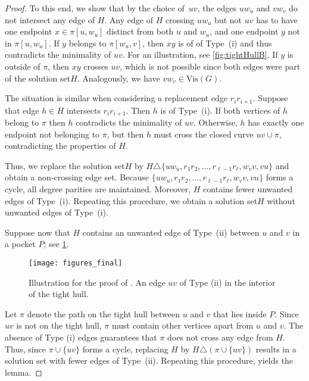 \documentclass[a4paper,runningheads,cleveref,thm-restate]{lipics-v2021}
\newcommand{\Vis}[1]{\ensuremath{\mathrm{Vis}(#1)}}
\newcommand{\hset}{solution set\xspace}
\begin{document}
\begin{proof}
	To this end, we show that by the choice of~$uv$, the edges $uw_u$ 
	 and $vw_v$ do not intersect any edge of $H$. 
	 Any edge of $H$ crossing $uw_u$ but not $uv$ has to have one endpoint $x \in \pi[u, w_u]$ distinct from both $u$ and $w_u$, and one endpoint $y$ not in 	$\pi[u,w_u]$. 
	 If $y$ belongs to $\pi[w_u, v]$, then $xy$ is of {of Type~(i)} and thus contradicts the minimality of $uv$. For an illustration, see  \cref{fig:tightHullB}.
	 If $y$ is outside of $\pi$, then $xy$ crosses $uv$, which is not possible since both edges were part of the \hset $H$. 
	 Analogously, we have $vw_v\in\Vis{G}$.

	The situation is similar when considering a replacement edge  $r_{i}r_{i+1}$.
	Suppose that edge $h \in H$ intersects $r_{i}r_{i+1}$.
	Then $h$ is of {Type~(i)}. If both vertices of $h$ belong to $\pi$ then $h$ contradicts the minimality of $uv$. Otherwise, $h$ has exactly one endpoint not belonging to $\pi$, but then $h$ 
	must cross the closed curve $uv \cup \pi$, contradicting the properties of $H$. 
	
	
	Thus, we replace the \hset $H$ by $H \triangle \{uw_u, r_{1}r_{2}, \dots, r_{\ell-1}r_\ell,w_vv,vu\}$ 
	and obtain a  non-crossing edge set.
	Because $\{uw_u, r_{1}r_{2}, \dots, r_{\ell-1}r_\ell,w_vv,vu\}$ forms a cycle, all degree parities are maintained. 
	Moreover, $H$ contains fewer unwanted edges of Type~(i). 
	Repeating this procedure, we obtain a \hset $H$ without unwanted edges of Type~(i). 

	
	Suppose now that $H$ contains an unwanted edge of Type~(ii) between $u$ and $v$ in a pocket $P$; see \cref{fig:tightHullC}. 
	\begin{figure}[htb]
		\centering
			\texttt{[image: figures\_final]}
		\caption{Illustration for the proof of . An edge $uv$ of Type (ii) in the interior of the tight hull. }
		
		\label{fig:tightHullC}
	\end{figure} 
	
	Let $\pi$ denote the path on the tight hull between $u$ and $v$ that lies inside $P$. 
	Since $uv$ is not on the tight hull, $\pi$ must contain other vertices apart from $u$ and $v$.
	The absence of Type (i) edges guarantees that $\pi$ does not cross any edge from $H$. 
	Thus, since $\pi \cup \{uv\}$ forms a cycle, replacing $H$ by $H \triangle (\pi \cup \{uv\})$ results in a \hset with fewer edges of Type~(ii). 
	Repeating this procedure, yields the lemma.
\end{proof}
\end{document}
